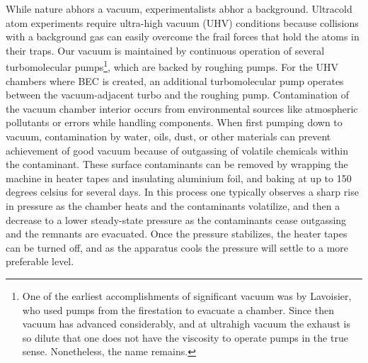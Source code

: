 	While nature abhors a vacuum, experimentalists abhor a background. Ultracold atom experiments require ultra-high vacuum (UHV) conditions because collisions with a background gas can easily overcome the frail forces that hold the atoms in their traps. Our vacuum is maintained by continuous operation of several turbomolecular pumps\footnote{One of the earliest accomplishments of significant vacuum was by Lavoisier, who used pumps from the firestation to evacuate a chamber. Since then vacuum has advanced considerably, and at ultrahigh vacuum the exhaust is so dilute that one does not have the viscosity to operate pumps in the true sense. Nonetheless, the name remains.}, which are backed by roughing pumps. For the UHV chambers where BEC is created, an additional turbomolecular pump operates between the vacuum-adjacent turbo and the roughing pump.  Contamination of the vacuum chamber interior occurs from environmental sources like atmospheric pollutants or errors while handling components. When first pumping down to vacuum, contamination by water, oils, dust, or other materials can prevent achievement of good vacuum because of outgassing of volatile chemicals within the contaminant. These surface contaminants can be removed by wrapping the machine in heater tapes and insulating aluminium foil, and baking at up to 150 degrees celsius for several days. In this process one typically observes a sharp rise in pressure as the chamber heats and the contaminants volatilize, and then a decrease to a lower steady-state pressure as the contaminants cease outgassing and the remnants are evacuated. Once the pressure stabilizes, the heater tapes can be turned off, and as the apparatus cools the pressure will settle to a more preferable level. 


